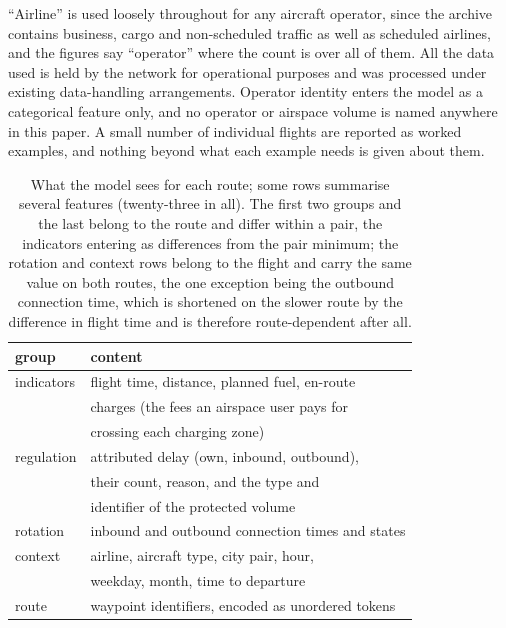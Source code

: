 \documentclass[preprint,authoryear,12pt]{elsarticle}
\begin{document}
``Airline'' is used loosely throughout for any aircraft operator,
since the archive contains business, cargo and non-scheduled traffic
as well as scheduled airlines, and the figures say ``operator'' where
the count is over all of them. All the data used is held by the
network for operational purposes and was processed under existing
data-handling arrangements. Operator identity enters the model as a categorical feature only,
and no operator or airspace volume is named anywhere in this paper. A
small number of individual flights are reported as worked examples,
and nothing beyond what each example needs is given about them.

\begin{table}[t]
\caption{What the model sees for each route; some rows summarise
several features (twenty-three in all). The first two groups and the
last belong to the route and differ within a pair, the indicators
entering as differences from the pair minimum; the rotation and context
rows belong to the flight and carry the same value on both routes, the
one exception being the outbound connection time, which is shortened on
the slower route by the difference in flight time and is therefore
route-dependent after all.}
\label{tab:features}
\centering\small
\begin{tabular}{ll}
\toprule
group & content \\
\midrule
indicators & flight time, distance, planned fuel, en-route \\
           & charges (the fees an airspace user pays for \\
           & crossing each charging zone) \\
regulation & attributed delay (own, inbound, outbound), \\ & their
count, reason, and the type and \\ & identifier of the protected
volume \\
rotation   & inbound and outbound connection times and states \\
context    & airline, aircraft type, city pair, hour, \\
           & weekday, month, time to departure \\
route      & waypoint identifiers, encoded as unordered tokens \\
\bottomrule
\end{tabular}
\end{table}
\end{document}
